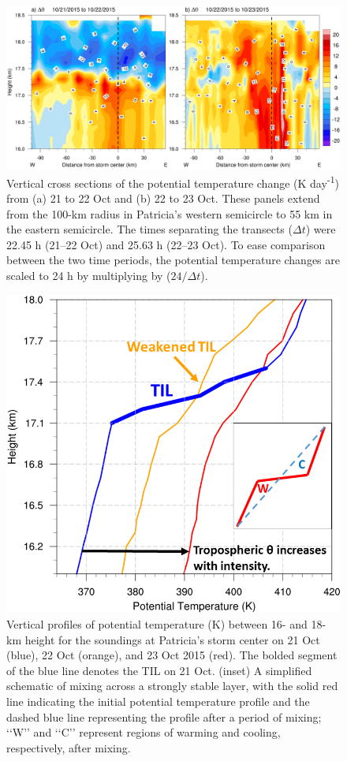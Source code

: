 \begin{figure}[ht]
\centerline{\includegraphics[width=39pc]{figures/fig06_deltatheta.png}}
\caption{Vertical cross sections of the potential temperature change (K day\textsuperscript{-1}) from (a) 21 to 22 Oct and (b) 22 to 23 Oct. These panels extend from the 100-km radius in Patricia’s western semicircle to 55 km in the eastern semicircle. The times separating the transects ($\Delta t$) were 22.45 h (21–22 Oct) and 25.63 h (22–23 Oct). To ease comparison between the two time periods, the potential temperature changes are scaled to 24 h by multiplying by ($24/\Delta t$).}
\label{fig:dtheta}
\end{figure}

\begin{figure}[ht]
\centerline{\includegraphics[width=33pc]{figures/fig07_schematic.png}}
\caption{Vertical profiles of potential temperature (K) between 16- and 18-km height for the soundings at Patricia’s storm center on 21 Oct (blue), 22 Oct (orange), and 23 Oct 2015 (red). The bolded segment of the blue line denotes the TIL on 21 Oct. (inset) A simplified schematic of mixing across a strongly stable layer, with the solid red line indicating the initial potential temperature profile and the dashed blue line representing the profile after a period of mixing; ‘‘W’’ and ‘‘C’’ represent regions of warming and cooling, respectively, after mixing.}
\label{fig:patricia-schematic}
\end{figure}

